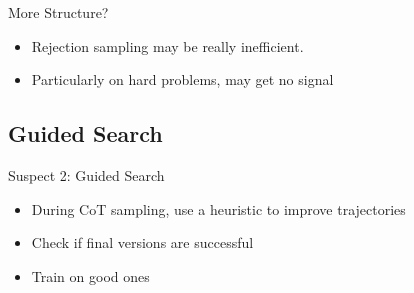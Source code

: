 \documentclass[14pt,aspectratio=169]{beamer}
\begin{document}
\begin{frame}{More Structure?}
	\begin{itemize}
		\item Rejection sampling may be really inefficient.
		\item Particularly on hard problems, may get no signal
	\end{itemize}
\end{frame}

\subsection{Guided Search}

\begin{frame}{Suspect 2: Guided Search}
	\begin{itemize}
		\item During CoT sampling, use a heuristic to
		      improve trajectories
		\item Check if final versions are successful
		\item Train on good ones
	\end{itemize}
\end{frame}
\end{document}
